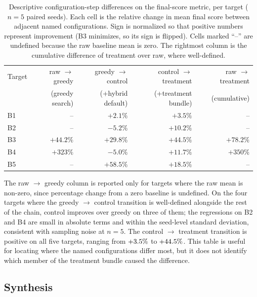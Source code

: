 \begin{table}[t]
  \centering
  \caption{Descriptive configuration-step differences on the final-score metric, per target ($n = 5$ paired seeds). Each cell is the relative change in mean final score between adjacent named configurations. Sign is normalized so that positive numbers represent improvement (B3 minimizes, so its sign is flipped). Cells marked ``--'' are undefined because the raw baseline mean is zero. The rightmost column is the cumulative difference of treatment over raw, where well-defined.}
  \label{tab:e2e-marginal}
  \scriptsize
  \begin{tabular}{@{}lrrrr@{}}
    \toprule
    Target & raw $\to$ greedy & greedy $\to$ control & control $\to$ treatment & raw $\to$ treatment \\
            & (greedy search)  & (+hybrid default) & (+treatment bundle)   & (cumulative)        \\
    \midrule
    B1 & --      & $+2.1\%$  & $+3.5\%$  & -- \\
    B2 & --      & $-5.2\%$  & $+10.2\%$ & -- \\
    B3 & $+44.2\%$ & $+29.8\%$ & $+44.5\%$ & $+78.2\%$ \\
    B4 & $+323\%$  & $-5.0\%$  & $+11.7\%$ & $+350\%$ \\
    B5 & --      & $+58.5\%$ & $+18.5\%$ & -- \\
    \bottomrule
  \end{tabular}
\end{table}

The raw $\to$ greedy column is reported only for targets where the raw mean is non-zero, since percentage change from a zero baseline is undefined.
On the four targets where the greedy $\to$ control transition is well-defined alongside the rest of the chain, control improves over greedy on three of them; the regressions on B2 and B4 are small in absolute terms and within the seed-level standard deviation, consistent with sampling noise at $n = 5$.
The control $\to$ treatment transition is positive on all five targets, ranging from $+3.5\%$ to $+44.5\%$.
This table is useful for locating where the named configurations differ most, but it does not identify which member of the treatment bundle caused the difference.

\subsection{Synthesis}
\label{sec:empirical-scope}

